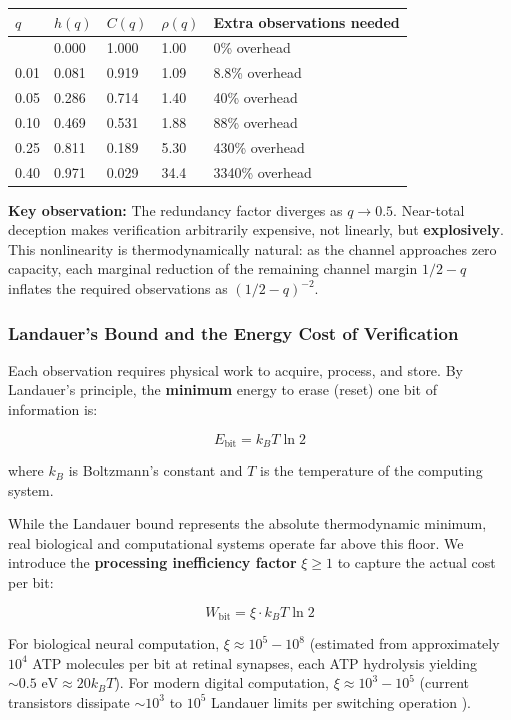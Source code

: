\documentclass[11pt]{article}
\theoremstyle{plain}
\theoremstyle{definition}
\theoremstyle{remark}
\newcounter{none}
\let\origsubsubsection\subsubsection
\renewcommand{\subsubsection}{\needspace{4\baselineskip}\origsubsubsection}
\begin{document}
{\def\LTcaptype{none} %
\begin{longtable}[]{@{}lllll@{}}
\toprule\noalign{}
\(q\) & \(h(q)\) & \(C(q)\) & \(\rho(q)\) & Extra observations needed \\
\midrule\noalign{}
\endhead
\bottomrule\noalign{}
\endlastfoot
0.00 & 0.000 & 1.000 & 1.00 & 0\% overhead \\
0.01 & 0.081 & 0.919 & 1.09 & 8.8\% overhead \\
0.05 & 0.286 & 0.714 & 1.40 & 40\% overhead \\
0.10 & 0.469 & 0.531 & 1.88 & 88\% overhead \\
0.25 & 0.811 & 0.189 & 5.30 & 430\% overhead \\
0.40 & 0.971 & 0.029 & 34.4 & 3340\% overhead \\
\end{longtable}
}

\textbf{Key observation:} The redundancy factor diverges as
\(q \to 0.5\). Near-total deception makes verification arbitrarily
expensive, not linearly, but \textbf{explosively}. This nonlinearity is
thermodynamically natural: as the channel approaches zero capacity, each
marginal reduction of the remaining channel margin \(1/2 - q\) inflates
the required observations as \((1/2 - q)^{-2}\).

\subsubsection{Landauer's Bound and the Energy Cost of
Verification}\label{landauers-bound-and-the-energy-cost-of-verification}

Each observation requires physical work to acquire, process, and store.
By Landauer's principle, the \textbf{minimum} energy to erase (reset)
one bit of information is:

\[E_{\text{bit}} = k_B T \ln 2\]

where \(k_B\) is Boltzmann's constant and \(T\) is the temperature of
the computing system.

While the Landauer bound represents the absolute thermodynamic minimum,
real biological and computational systems operate far above this floor.
We introduce the \textbf{processing inefficiency factor} \(\xi \geq 1\)
to capture the actual cost per bit:

\[W_{\text{bit}} = \xi \cdot k_B T \ln 2\]

For biological neural computation, \(\xi \approx 10^5 - 10^8\)
\citep{Laughlin1998} (estimated from approximately \(10^4\) ATP
molecules per bit at retinal synapses, each ATP hydrolysis yielding
\(\sim 0.5 \text{ eV} \approx 20 k_B T\)). For modern digital
computation, \(\xi \approx 10^3 - 10^5\) (current transistors dissipate
\(\sim 10^3\) to \(10^5\) Landauer limits per switching operation
\citep{Frank2002}).
\end{document}
